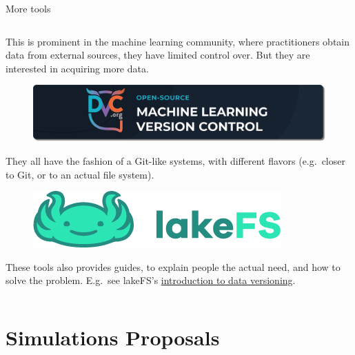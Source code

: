 \documentclass[9pt]{beamer}
\begin{document}
\begin{frame}{More tools}
\begin{columns}
\begin{column}{0.5\textwidth}
            This is prominent in the machine learning community, where
            practitioners obtain data from external sources, they have
            limited control over.
            But they are interested in acquiring more data.
            \begin{figure}
                \centering
                \href{https://dvc.org/}{
                    \includegraphics[width=0.9\hsize]{dvc-round}
                }
            \end{figure}
            \begin{center}
            \end{center}

            They all have the fashion of a Git-like systems, with different
            flavors (e.g.\ closer to Git, or to an actual file system).
            \begin{figure}
                \centering
                \href{https://lakefs.io/}{
                    \includegraphics[width=0.6\hsize]{lakefs}
                }
            \end{figure}
            \begin{center}
            \end{center}
            These tools also provides guides, to explain people the actual need,
            and how to solve the problem.
            E.g.\ see lakeFS's
            \href{https://lakefs.io/data-versioning/}{introduction to data
            versioning}.
        \end{column}
    \end{columns}
\end{frame}


\section{Simulations Proposals}
\end{document}
